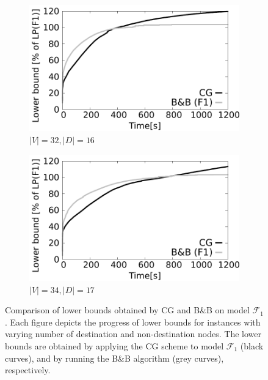 \begin{figure}[!htb]
    \begin{subfigure}[b]{0.49\textwidth}
        \includegraphics[width=\textwidth]{lower-bound-32-16}
        \caption{$|V|=32, |D|=16$}
        \label{fig:cggr32-16}
    \end{subfigure}
    \hfill %
    \begin{subfigure}[b]{0.49\textwidth}
        \includegraphics[width=\textwidth]{lower-bound-34-17}
        \caption{$|V|=34, |D|=17$}
        \label{fig:cggr34-17}
    \end{subfigure}
  \caption{Comparison of lower bounds obtained by CG and B\&B on model $\mathcal{F}_1$.
	Each figure depicts the progress of lower bounds for instances with varying number of destination and non-destination nodes.
	The lower bounds are obtained by applying the CG scheme to model $\mathcal{F}_1$ (black curves), and by running the B\&B algorithm (grey curves), respectively.
	}
  \label{fig:cggr}
\end{figure} 

